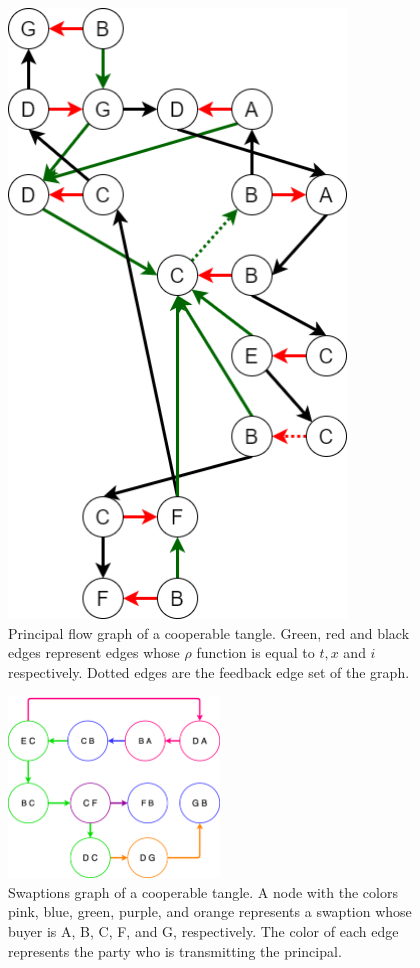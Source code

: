 \begin{figure}
    \centering
    \includegraphics[width=0.8\textwidth]{figures/example.png}
    \caption{Principal flow graph of a cooperable tangle. Green, red and black edges represent edges whose $\rho$ function is equal to $t, x$ and $i$ respectively. Dotted edges are the feedback edge set of the graph.}
    \label{fig:example-pf}
\end{figure}
\begin{figure}
    \centering
    \includegraphics[width=0.5\textwidth]{figures/cooperable-example-swaption.png}
    \caption{Swaptions graph of a cooperable tangle. A node with the colors pink, blue, green, purple, and orange represents a swaption whose buyer is A, B, C, F, and G, respectively. The color of each edge represents the party who is transmitting the principal.}
    \label{fig:example-swp}
\end{figure}
